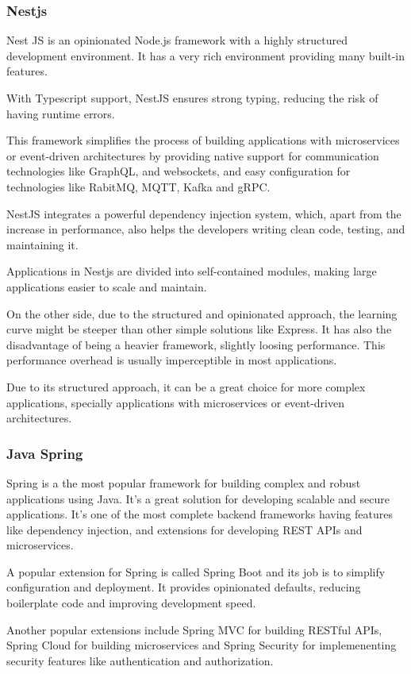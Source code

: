 \subsubsection{Nestjs}
Nest JS is an opinionated Node.js framework with a highly structured
development environment. It has a very rich environment providing many built-in
features.

With Typescript support, NestJS ensures strong typing, reducing the risk of
having runtime errors.

This framework simplifies the process of building applications with
microservices or event-driven architectures by providing native support for
communication technologies like GraphQL, and websockets, and easy configuration
for technologies like RabitMQ, MQTT, Kafka and \gls{gRPC}.

NestJS integrates a powerful dependency injection system, which, apart from the
increase in performance, also helps the developers writing clean code, testing,
and maintaining it.

Applications in Nestjs are divided into
self-contained modules, making large applications easier to scale and maintain.

On the other side, due to the structured and opinionated approach, the learning
curve might be steeper than other simple solutions like Express.
It has also the disadvantage of being a heavier framework, slightly loosing
performance. This performance overhead is usually imperceptible in most
applications.

Due to its structured approach, it can be a great choice for more complex
applications, specially applications with microservices or event-driven
architectures.
\subsubsection{Java Spring}
Spring is a the most popular framework for building complex and robust
applications using Java. It's a great solution for developing scalable and secure
applications. It's one of the most complete backend frameworks having features
like dependency injection, and extensions for developing REST APIs and
microservices.

A popular extension for Spring is called Spring Boot and its job is to
simplify configuration and deployment. It provides opinionated defaults,
reducing boilerplate code and improving development speed.

Another popular extensions include Spring MVC for building RESTful APIs, Spring
Cloud for building microservices and Spring Security for implemenenting
security features like authentication and authorization.

